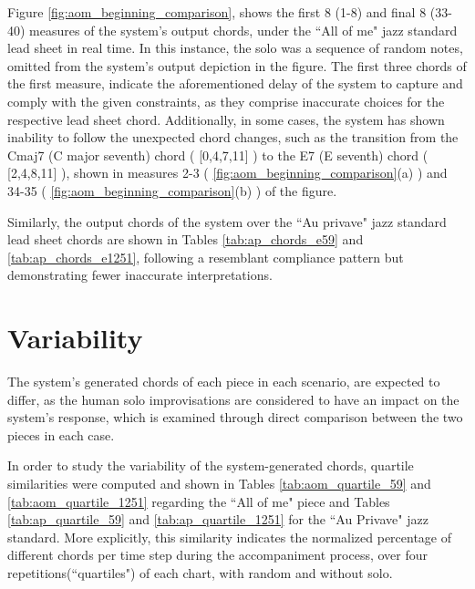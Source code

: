     Figure \ref{fig:aom_beginning_comparison}, shows the first 8 (1-8) and final 8 (33-40) measures of the system's output chords, under the ``All of me" jazz standard lead sheet in real time. In this instance, the solo was a sequence of random notes, omitted from the system's output depiction in the figure. The first three chords of the first measure, indicate the aforementioned delay of the system to capture and comply with the given constraints, as they comprise inaccurate choices for the respective lead sheet chord. Additionally, in some cases, the system has shown inability to follow the unexpected chord changes, such as the transition from the Cmaj7 (C major seventh) chord ( [0,4,7,11] ) to the E7 (E seventh) chord ( [2,4,8,11] ), shown in measures 2-3 ( \ref{fig:aom_beginning_comparison}(a) ) and 34-35 ( \ref{fig:aom_beginning_comparison}(b) ) of the figure. 


    Similarly, the output chords of the system over the ``Au privave" jazz standard lead sheet chords are shown in Tables \ref{tab:ap_chords_e59} and \ref{tab:ap_chords_e1251}, following a resemblant compliance pattern but demonstrating fewer inaccurate interpretations.

    \section{Variability}
    
    The system's generated chords of each piece in each scenario, are expected to differ, as the human solo improvisations are considered to have an impact on the system's response, which is examined through direct comparison between the two pieces in each case.

    
    
    
    

    In order to study the variability of the system-generated chords, quartile similarities were computed and shown in Tables \ref{tab:aom_quartile_59} and \ref{tab:aom_quartile_1251} regarding the ``All of me" piece and Tables \ref{tab:ap_quartile_59} and \ref{tab:ap_quartile_1251} for the ``Au Privave" jazz standard. More explicitly, this similarity indicates the normalized percentage of different chords per time step during the accompaniment process, over four repetitions(``quartiles") of each chart, with random and without solo.  
    
